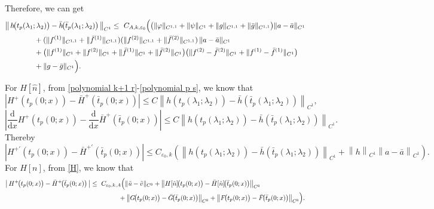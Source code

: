 \documentclass[a4paper,reqno,11pt]{amsart}
\numberwithin{equation}{section} %
\begin{document}
Therefore, we can get
\[
\begin{aligned}
&\bigl\|\,h\!\bigl(t_p(\lambda_1;\lambda_2)\bigr)
 - \bar h\!\bigl(\bar t_p(\lambda_1;\lambda_2)\bigr)\,\bigr\|_{C^{1}}
\le{}\ C_{A,k,\varepsilon_0}\Bigl(
   \bigl(\|\varphi\|_{C^{1,1}}+\|\psi\|_{C^{1}}
     + \|g\|_{C^{1,1}}+\|\bar g\|_{C^{1,1}}\bigr) \|a-\bar a\|_{C^{1}}
\\
&\qquad \qquad
     + (\|f^{(1)}\|_{C^{1,1}}+\|\bar f^{(1)}\|_{C^{1,1}})
       (\|f^{(2)}\|_{C^{1,1}}+\|\bar f^{(2)}\|_{C^{1,1}})\,
    \|a-\bar a\|_{C^{1}}
\\
&\qquad \qquad
  + \bigl(\|f^{(1)}\|_{C^{1}}+\|f^{(2)}\|_{C^{1}}
       +\|\bar f^{(1)}\|_{C^{1}}+\|\bar f^{(2)}\|_{C^{1}}\bigr)
  \bigl(\|f^{(2)}-\bar f^{(2)}\|_{C^{1}}
       +\|f^{(1)}-\bar f^{(1)}\|_{C^{1}}\bigr)
\\
&\qquad \qquad
  + \|g-\bar g\|_{C^{1}}
\Bigr).
\end{aligned}
\]

For $H[\hat{n}]$, from \eqref{polynomial k+1 r}-\eqref{polynomial p s}, we know that
$$
\left| H^+\left( t_p(0;x) \right) -\bar{H}^+\left( \bar{t}_p(0;x) \right) \right|\le C\left\| h\left( t_p\left( \lambda _1;\lambda _2 \right) \right) -\bar{h}\left( \bar{t}_p\left( \lambda _1;\lambda _2 \right) \right) \right\| _{C^1},
$$
$$
\left| \frac{\mathrm{d}}{\mathrm{d}x} H^+\left( t_p(0;x) \right) -\frac{\mathrm{d}}{\mathrm{d}x}\bar{H}^+\left( \bar{t}_p(0;x) \right) \right|\le C\left\| h\left( t_p\left( \lambda _1;\lambda _2 \right) \right) -\bar{h}\left( \bar{t}_p\left( \lambda _1;\lambda _2 \right) \right) \right\| _{C^1}.
$$
Thereby
$$
\left| H^{+\prime}\left( t_p(0;x) \right) -\bar{H}^{+\prime}\left( \bar{t}_p(0;x) \right) \right|\le C_{\varepsilon _0,k}\left( \left\| h\left( t_p\left( \lambda _1;\lambda _2 \right) \right) -\bar{h}\left( \bar{t}_p\left( \lambda _1;\lambda _2 \right) \right) \right\| _{C^1}+\left\| h \right\| _{C^1}\left\| a-\bar{a} \right\| _{C^1} \right) .
$$
For $H[n]$, from \eqref{H}, we know that 
\[
\begin{aligned}
\bigl|\,H^+\!\bigl(t_p(0;x)\bigr)-\bar H^+\!\bigl(\bar t_p(0;x)\bigr)\,\bigr|
\le{}&\ C_{\varepsilon_0,k,A}\Bigl(
  \|\tilde u-\tilde v\|_{C^{0}}
  + \bigl\| H[\hat n]\!\bigl(t_p(0;x)\bigr)-\bar H[\hat n]\!\bigl(\bar t_p(0;x)\bigr)\bigr\|_{C^{0}} \\
&\qquad\quad
  + \bigl\| G\!\bigl(t_p(0;x)\bigr)-\bar G\!\bigl(\bar t_p(0;x)\bigr)\bigr\|_{C^{0}}
  + \bigl\| F\!\bigl(t_p(0;x)\bigr)-\bar F\!\bigl(\bar t_p(0;x)\bigr)\bigr\|_{C^{0}}
\Bigr).
\end{aligned}
\]
\end{document}
